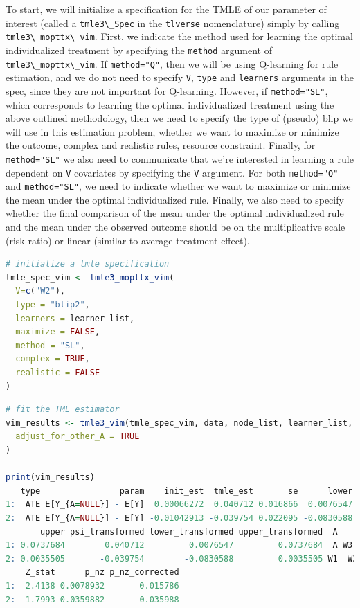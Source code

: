 \documentclass[
  12pt, krantz2,
]{krantz}
\newcommand{\passthrough}[1]{#1}
\newcommand{\1}{\mathbbm{1}}
\theoremstyle{definition}
\theoremstyle{definition}
\theoremstyle{definition}
\theoremstyle{definition}
\theoremstyle{remark}
\begin{document}
To start, we will initialize a specification for the TMLE of our parameter of
interest (called a \passthrough{\lstinline!tmle3\_Spec!} in the \passthrough{\lstinline!tlverse!} nomenclature) simply by calling
\passthrough{\lstinline!tmle3\_mopttx\_vim!}. First, we indicate the method used for learning the optimal
individualized treatment by specifying the \passthrough{\lstinline!method!} argument of
\passthrough{\lstinline!tmle3\_mopttx\_vim!}. If \passthrough{\lstinline!method="Q"!}, then we will be using Q-learning for rule
estimation, and we do not need to specify \passthrough{\lstinline!V!}, \passthrough{\lstinline!type!} and \passthrough{\lstinline!learners!} arguments
in the spec, since they are not important for Q-learning. However, if
\passthrough{\lstinline!method="SL"!}, which corresponds to learning the optimal individualized
treatment using the above outlined methodology, then we need to specify the type
of (pseudo) blip we will use in this estimation problem, whether we want to
maximize or minimize the outcome, complex and realistic rules, resource constraint.
Finally, for \passthrough{\lstinline!method="SL"!} we also need to communicate that we're interested in learning a
rule dependent on \passthrough{\lstinline!V!} covariates by specifying the \passthrough{\lstinline!V!} argument. For both
\passthrough{\lstinline!method="Q"!} and \passthrough{\lstinline!method="SL"!}, we need to indicate whether we want to maximize
or minimize the mean under the optimal individualized rule. Finally, we also
need to specify whether the final comparison of the mean under the optimal
individualized rule and the mean under the observed outcome should be on the
multiplicative scale (risk ratio) or linear (similar to average treatment
effect).

\begin{lstlisting}[language=R]
# initialize a tmle specification
tmle_spec_vim <- tmle3_mopttx_vim(
  V=c("W2"),
  type = "blip2",
  learners = learner_list,
  maximize = FALSE,
  method = "SL",
  complex = TRUE,
  realistic = FALSE
)
\end{lstlisting}

\begin{lstlisting}[language=R]
# fit the TML estimator
vim_results <- tmle3_vim(tmle_spec_vim, data, node_list, learner_list,
  adjust_for_other_A = TRUE
)

print(vim_results)
   type                param    init_est  tmle_est       se      lower
1:  ATE E[Y_{A=NULL}] - E[Y]  0.00066272  0.040712 0.016866  0.0076547
2:  ATE E[Y_{A=NULL}] - E[Y] -0.01042913 -0.039754 0.022095 -0.0830588
       upper psi_transformed lower_transformed upper_transformed  A           W
1: 0.0737684        0.040712         0.0076547         0.0737684  A W3,W4,W2,W1
2: 0.0035505       -0.039754        -0.0830588         0.0035505 W1  W3,W4,W2,A
    Z_stat      p_nz p_nz_corrected
1:  2.4138 0.0078932       0.015786
2: -1.7993 0.0359882       0.035988
\end{lstlisting}
\end{document}
